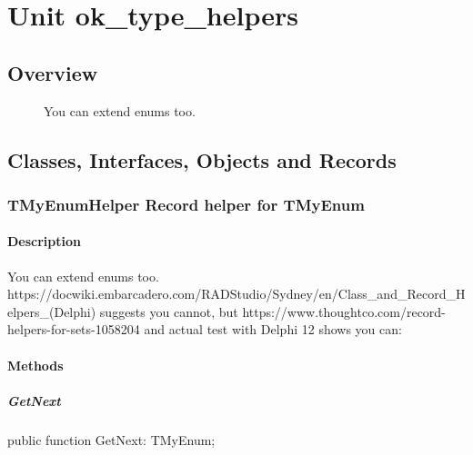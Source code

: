 \documentclass{report}
\begin{document}
\newlength{\tmplength}
\chapter{Unit ok{\_}type{\_}helpers}
\section{Overview}
\begin{description}
\item[\texttt{\begin{ttfamily}TStringHelper\end{ttfamily} Record}]
\item[\texttt{\begin{ttfamily}TMyEnumHelper\end{ttfamily} Record}]You can extend enums too.
\end{description}
\section{Classes, Interfaces, Objects and Records}
\subsection*{TMyEnumHelper Record helper for TMyEnum}
\subsubsection*{\large{\textbf{Description}}\normalsize\hspace{1ex}\hfill}
You can extend enums too. https://docwiki.embarcadero.com/RADStudio/Sydney/en/Class{\_}and{\_}Record{\_}Helpers{\_}(Delphi) suggests you cannot, but https://www.thoughtco.com/record-helpers-for-sets-1058204 and actual test with Delphi 12 shows you can:\subsubsection*{\large{\textbf{Methods}}\normalsize\hspace{1ex}\hfill}
\paragraph*{GetNext}\hspace*{\fill}

\begin{list}{}{
\setlength{\itemindent}{0cm}
\setlength{\listparindent}{0cm}
\setlength{\leftmargin}{\evensidemargin}
\addtolength{\leftmargin}{\tmplength}
\settowidth{\labelsep}{X}
\addtolength{\leftmargin}{\labelsep}
\setlength{\labelwidth}{\tmplength}
}
\begin{flushleft}
\item[\textbf{Declaration}\hfill]
\begin{ttfamily}
public function GetNext: TMyEnum;\end{ttfamily}


\end{flushleft}
\end{list}
\end{document}
